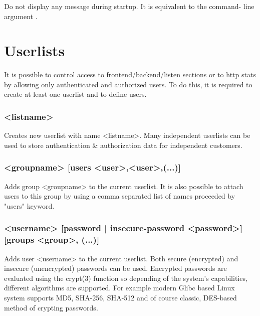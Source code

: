 \subsubsection[quiet]{}

Do not display any message during startup. It is equivalent to the command-
line argument .

\section{Userlists}
\label{sec:userlists}

It is possible to control access to frontend/backend/listen sections or to
http stats by allowing only authenticated and authorized users. To do this,
it is required to create at least one userlist and to define users.

\subsubsection[userlist]{ <listname>}

Creates new userlist with name <listname>. Many independent userlists can be
used to store authentication \& authorization data for independent customers.

\subsubsection[group]{ <groupname> [users <user>,<user>,(...)]}

Adds group <groupname> to the current userlist. It is also possible to
attach users to this group by using a comma separated list of names
proceeded by "users" keyword.

\subsubsection[user]{ <username> [password | insecure-password <password>]
  [groups <group>, (...)]}

Adds user <username> to the current userlist. Both secure (encrypted) and
insecure (unencrypted) passwords can be used. Encrypted passwords are
evaluated using the crypt(3) function so depending of the system's
capabilities, different algorithms are supported. For example modern Glibc
based Linux system supports MD5, SHA-256, SHA-512 and of course classic,
DES-based method of crypting passwords.

